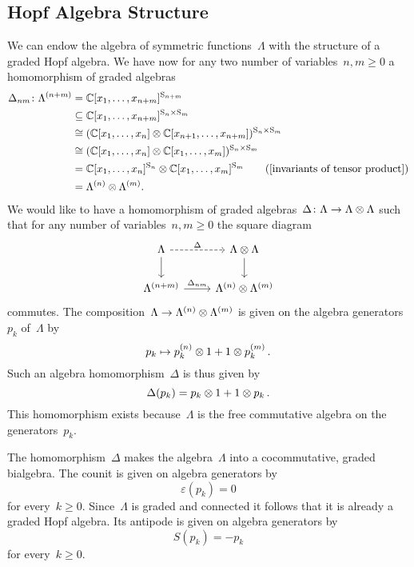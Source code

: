 \documentclass[a4paper,11pt]{scrartcl}
\begin{document}
\subsection{Hopf Algebra Structure}

We can endow the algebra of symmetric functions~$\Lambda$ with the structure of a graded Hopf algebra.
We have now for any two number of variables~$n, m \geq 0$ a homomorphism of graded algebras
\begin{align*}
  \Delta_{nm}
  \colon
  \Lambda^{(n+m)}
  &=
  \Complex[x_1, \dotsc, x_{n+m}]^{\symm_{n+m}}
  \\
  &\subseteq
  \Complex[x_1, \dotsc, x_{n+m}]^{\symm_n \times \symm_m}
  \\
  &\cong
  ( \Complex[x_1, \dotsc, x_n] \tensor \Complex[x_{n+1}, \dotsc, x_{n+m}] )^{\symm_n \times \symm_m}
  \\
  &\cong
  ( \Complex[x_1, \dotsc, x_n] \tensor \Complex[x_1, \dotsc, x_m] )^{\symm_n \times \symm_m}
  \\
  &=
  \Complex[x_1, \dotsc, x_n]^{\symm_n} \tensor \Complex[x_1, \dotsc, x_m]^{\symm_m}
  \tag{\cref{invariants of tensor product}}
  \\
  &=
  \Lambda^{(n)} \tensor \Lambda^{(m)}.
\end{align*}
We would like to have a homomorphism of graded algebras~$\Delta \colon \Lambda \to \Lambda \otimes \Lambda$ such that for any number of variables~$n, m \geq 0$ the square diagram
\[
  \begin{tikzcd}
    \Lambda
    \arrow[dashed]{r}[above]{\Delta}
    \arrow{d}
    &
    \Lambda \tensor \Lambda
    \arrow{d}
    \\
    \Lambda^{(n+m)}
    \arrow{r}[above]{\Delta_{nm}}
    &
    \Lambda^{(n)} \tensor \Lambda^{(m)}
  \end{tikzcd}
\]
commutes.
The composition~$\Lambda \to \Lambda^{(n)} \otimes \Lambda^{(m)}$ is given on the algebra generators~$p_k$ of~$\Lambda$ by
\[
  p_k \mapsto p^{(n)}_k \otimes 1 + 1 \otimes p^{(m)}_k \,.
\]
Such an algebra homomorphism~$\Delta$ is thus given by
\[
  \Delta(p_k) = p_k \otimes 1 + 1 \otimes p_k \,.  
\]
This homomorphism exists because~$\Lambda$ is the free commutative algebra on the generators~$p_k$.

The homomorphism~$\Delta$ makes the algebra~$\Lambda$ into a cocommutative, graded bialgebra.
The counit is given on algebra generators by
\[
  \varepsilon(p_k) = 0
\]
for every~$k \geq 0$.
Since~$\Lambda$ is graded and connected it follows that it is already a graded Hopf algebra.
Its antipode is given on algebra generators by
\[
  S(p_k) = -p_k
\]
for every~$k \geq 0$.
\end{document}

